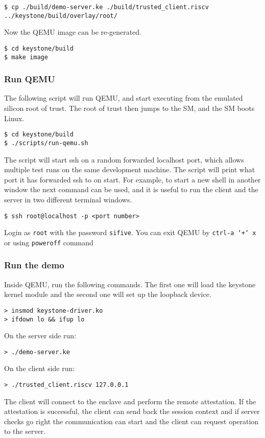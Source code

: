 \begin{lstlisting}[frame=single]
$ cp ./build/demo-server.ke ./build/trusted_client.riscv ../keystone/build/overlay/root/
\end{lstlisting}
Now the QEMU image can be re-generated.

\begin{lstlisting}[frame=single]
$ cd keystone/build
$ make image
\end{lstlisting}

\subsubsection{Run QEMU}
The following script will run QEMU, and start executing from the emulated silicon root of trust. The root of trust then jumps to the SM, and the SM boots Linux. 
\begin{lstlisting}[frame=single]
$ cd keystone/build
$ ./scripts/run-qemu.sh
\end{lstlisting}
The script will start ssh on a random forwarded localhost port, which allows multiple test runs on the same development machine. The script will print what port it has forwarded ssh to on start. For example, to start a new shell in another window the next command can be used, and it is useful to run the client and the server in two different terminal windows. 
\begin{lstlisting}[frame=single]
$ ssh root@localhost -p <port number>
\end{lstlisting}
Login as \texttt{\color{RedOrange}root} with the password \texttt{\color{RedOrange}sifive}. You can exit QEMU by \texttt{\color{RedOrange}ctrl-a\ `+`\ x} or using  \texttt{\color{RedOrange}poweroff}  command

\subsubsection{Run the demo}
Inside QEMU, run the following commands. The first one will load the keystone kernel module and the second one will set up the loopback device. 
\begin{lstlisting}[frame=single]
> insmod keystone-driver.ko 
> ifdown lo && ifup lo           
\end{lstlisting}
On the server side run: 
\begin{lstlisting}[frame=single]
> ./demo-server.ke         
\end{lstlisting}
On the client side run:
\begin{lstlisting}[frame=single]
> ./trusted_client.riscv 127.0.0.1        
\end{lstlisting}
The client will connect to the enclave and perform the remote attestation. If the attestation is successful, the client can send back the session context and if server checks go right the communication can start and the client can request operation to the server. 


